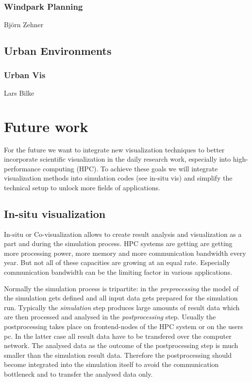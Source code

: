 \subsubsection{Windpark Planning}
\label{windpark-planning}

Björn Zehner

\subsection{Urban Environments}
\label{urban-environments}

\subsubsection{Urban Vis}
\label{urban-vis}

Lars Bilke

\section{Future work}
\label{future-work}

For the future we want to integrate new visualization techniques to
better incorporate scientific visualization in the daily research work,
especially into high-performance computing (HPC). To achieve these goals
we will integrate visualization methods into simulation codes (see
in-situ vis) and simplify the technical setup to unlock more fields of
applications.

\subsection{In-situ visualization}
\label{in-situ-visualization}

In-situ or Co-visualization allows to create result analysis and
visualization as a part and during the simulation process. HPC systems
are getting are getting more processing power, more memory and more
communication bandwidth every year. But not all of these capacities are
growing at an equal rate. Especially communication bandwidth can be the
limiting factor in various applications.

Normally the simulation process is tripartite: in the
\emph{preprocessing} the model of the simulation gets defined and all
input data gets prepared for the simulation run. Typically the
\emph{simulation} step produces large amounts of result data which are
then processed and analysed in the \emph{postprocessing} step. Usually
the postprocessing takes place on frontend-nodes of the HPC system or on
the users pc. In the latter case all result data have to be transfered
over the computer network. The analysed data as the outcome of the
postprocessing step is much smaller than the simulation result data.
Therefore the postprocessing should become integrated into the
simulation itself to avoid the communication bottleneck and to transfer
the analysed data only.

